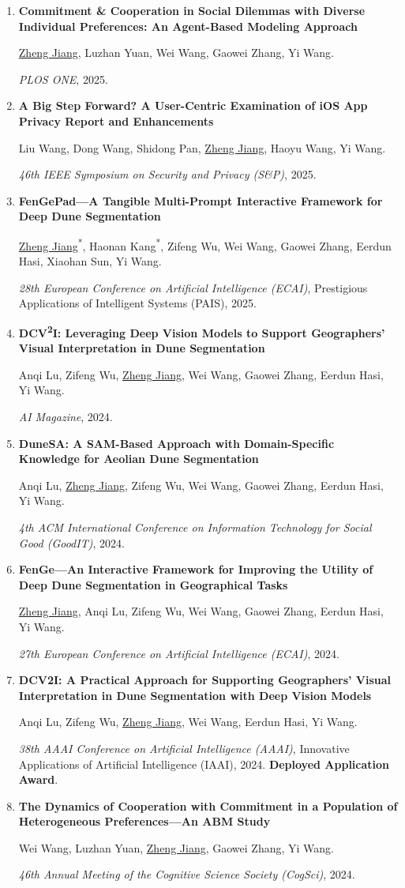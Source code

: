 \documentclass[10pt,letterpaper]{article}
\newcommand{\self}{\uline{Zheng Jiang}}
\newcommand{\pubitem}[3]{%
  \needspace{4.8\baselineskip}%
  \item \textbf{#1}\par\vspace{-0.4pt}%
  #2\par\vspace{-0.4pt}%
  #3%
}
\begin{document}
\begin{enumerate}
  \pubitem{Commitment \& Cooperation in Social Dilemmas with Diverse Individual Preferences: An Agent-Based Modeling Approach}
    {\self, Luzhan Yuan, Wei Wang, Gaowei Zhang, Yi Wang.}
    {\textit{PLOS ONE}, 2025.}

  \pubitem{A Big Step Forward? A User-Centric Examination of iOS App Privacy Report and Enhancements}
    {Liu Wang, Dong Wang, Shidong Pan, \self, Haoyu Wang, Yi Wang.}
    {\textit{46th IEEE Symposium on Security and Privacy (S\&P)}, 2025.}

  \pubitem{FenGePad---A Tangible Multi-Prompt Interactive Framework for Deep Dune Segmentation}
    {\self\textsuperscript{*}, Haonan Kang\textsuperscript{*}, Zifeng Wu, Wei Wang, Gaowei Zhang, Eerdun Hasi, Xiaohan Sun, Yi Wang.}
    {\textit{28th European Conference on Artificial Intelligence (ECAI)}, Prestigious Applications of Intelligent Systems (PAIS), 2025.}

  \pubitem{DCV\textsuperscript{2}I: Leveraging Deep Vision Models to Support Geographers' Visual Interpretation in Dune Segmentation}
    {Anqi Lu, Zifeng Wu, \self, Wei Wang, Gaowei Zhang, Eerdun Hasi, Yi Wang.}
    {\textit{AI Magazine}, 2024.}

  \pubitem{DuneSA: A SAM-Based Approach with Domain-Specific Knowledge for Aeolian Dune Segmentation}
    {Anqi Lu, \self, Zifeng Wu, Wei Wang, Gaowei Zhang, Eerdun Hasi, Yi Wang.}
    {\textit{4th ACM International Conference on Information Technology for Social Good (GoodIT)}, 2024.}

  \pubitem{FenGe---An Interactive Framework for Improving the Utility of Deep Dune Segmentation in Geographical Tasks}
    {\self, Anqi Lu, Zifeng Wu, Wei Wang, Gaowei Zhang, Eerdun Hasi, Yi Wang.}
    {\textit{27th European Conference on Artificial Intelligence (ECAI)}, 2024.}

  \pubitem{DCV2I: A Practical Approach for Supporting Geographers' Visual Interpretation in Dune Segmentation with Deep Vision Models}
    {Anqi Lu, Zifeng Wu, \self, Wei Wang, Eerdun Hasi, Yi Wang.}
    {\textit{38th AAAI Conference on Artificial Intelligence (AAAI)}, Innovative Applications of Artificial Intelligence (IAAI), 2024. \textbf{Deployed Application Award}.}

  \pubitem{The Dynamics of Cooperation with Commitment in a Population of Heterogeneous Preferences---An ABM Study}
    {Wei Wang, Luzhan Yuan, \self, Gaowei Zhang, Yi Wang.}
    {\textit{46th Annual Meeting of the Cognitive Science Society (CogSci)}, 2024.}
\end{enumerate}
\end{document}
